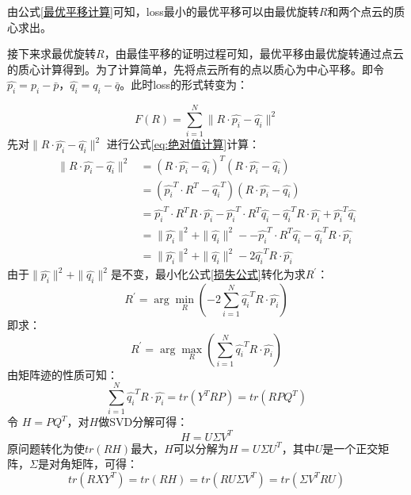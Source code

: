 由公式\eqref{最优平移计算}可知，loss最小的最优平移可以由最优旋转$R$和两个点云的质心求出。

接下来求最优旋转$R$，由最佳平移的证明过程可知，最优平移由最优旋转通过点云的质心计算得到。为了计算简单，先将点云所有的点以质心为中心平移。即令$\hat{p_i} = p_i - \bar{p}$，$\hat{q_i} = q_i - \bar{q}$。此时loss的形式转变为：

\begin{equation}
	\label{损失公式}
	F(R) = \sum_{i=1}^{N} \| R\cdot\hat{p_i} - \hat{q_i}  \|^2
\end{equation}
先对$ \| R\cdot\hat{p_i} - \hat{q_i}  \|^2$ 进行公式\eqref{eq:绝对值计算}计算：
\begin{equation}
	\label{eq:绝对值计算}
	\begin{split}
		\| R\cdot\hat{p_i} - \hat{q_i}  \|^2 &= ( R\cdot\hat{p_i} - \hat{q_i})^T ( R\cdot\hat{p_i} - \hat{q_i}) \\
		&= ( \hat{p_i}^T \cdot R^T - \hat{q_i}^T) ( R\cdot\hat{p_i} - \hat{q_i}) \\
		&= \hat{p_i}^T \cdot R^T  R\cdot\hat{p_i} -  \hat{p_i}^T \cdot R^T  \hat{q_i} -  \hat{q_i}^TR\cdot\hat{p_i} +  \hat{p_i}^T \hat{q_i} \\
		&= \| \hat{p_i} \| ^2 +  \| \hat{q_i} \| ^2 - -  \hat{p_i}^T \cdot R^T  \hat{q_i} -  \hat{q_i}^TR\cdot\hat{p_i} \\
		&=  \| \hat{p_i} \| ^2 +  \| \hat{q_i} \| ^2  - 2 \hat{q_i}^TR\cdot\hat{p_i}
	\end{split}
\end{equation}
由于$ \| \hat{p_i} \| ^2 +  \| \hat{q_i} \| ^2 $是不变，最小化公式\eqref{损失公式}转化为求$R^{\prime}$：
\begin{equation}
	R^{\prime} = \arg\min_{R} ( - 2\sum_{i=1}^{N} \hat{q_i}^TR\cdot\hat{p_i})
\end{equation}
即求：
\begin{equation}
	R^{\prime} = \arg\max_{R}(\sum_{i=1}^{N}\hat{q_i}^TR\cdot\hat{p_i})
\end{equation}
由矩阵迹的性质可知：
\begin{equation}
\sum_{i=1}^{N}\hat{q_i}^TR\cdot\hat{p_i} = tr(Y^T R P) =  tr(R P Q^T )
\end{equation}
令 $H= PQ^T$，对$H$做SVD分解可得：
\begin{equation}
H=U\Sigma V^T
\end{equation}
原问题转化为使$tr(RH)$最大，$H$可以分解为$H=U\Sigma U^T$，其中$U$是一个正交矩阵，$\Sigma$是对角矩阵，可得：
\begin{equation}
	tr(R X Y^T ) = tr(RH) = tr(RU\Sigma V^T)= tr(\Sigma V^TRU)
\end{equation}

